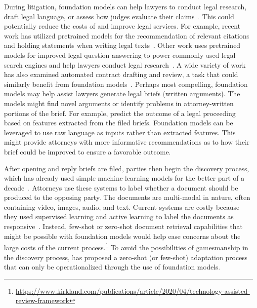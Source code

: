 During litigation, foundation models can help lawyers to conduct legal research, draft legal language, or assess how judges evaluate their claims~\citep{zheng2021does,huang2021context,ostendorff2021evaluating,vold2021using, chalkidis2020legal, chalkidis2019neural}. This could potentially reduce the costs of and improve legal services. For example, recent work has utilized pretrained models for the recommendation of relevant citations and holding statements when writing legal texts~\citep{zheng2021does,huang2021context,ostendorff2021evaluating}. Other work uses pretrained models for improved legal question answering to power commonly used legal search engines and help lawyers conduct legal research~\citep{vold2021using}. A wide variety of work has also examined automated contract drafting and review, a task that could similarly benefit from foundation models~\citep{hendrycks2021cuad,betts2017dawn}. Perhaps most compelling, foundation models may help assist lawyers  generate legal briefs (written arguments). The models might find novel arguments or identify problems in attorney-written portions of the brief. For example, \citet{tippett2021does} predict the outcome of a legal proceeding based on features extracted from the filed briefs. Foundation models can be leveraged to use raw language as inputs rather than extracted features. This might provide attorneys with more informative recommendations as to how their brief could be improved to ensure a favorable outcome.

After opening and reply briefs are filed, parties then begin the discovery process, which has already used simple machine learning models for the better part of a decade~\citep{grossman2010technology}. Attorneys use these systems to label whether a document should be produced to the opposing party. The documents are multi-modal in nature, often containing video, images, audio, and text. Current systems are costly because they used supervised learning and active learning to label the documents as responsive~\citep{grossman2010technology,oard2018jointly,yang2021goldilocks}. Instead, few-shot or zero-shot document retrieval capabilities that might be possible with foundation models would help ease concerns about the large costs of the current process.\footnote{\href{https://www.kirkland.com/publications/article/2020/04/technology-assisted-review-framework}{https://www.kirkland.com/publications/article/2020/04/technology-assisted-review-framework}} To avoid the possibilities of gamesmanship in the discovery process, \citet{cui2018application} has proposed a zero-shot (or few-shot) adaptation process that can only be operationalized through the use of foundation models.

